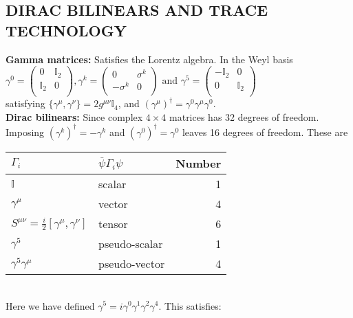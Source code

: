 \documentclass[a4paper, norsk, 8pt, landscape]{article}
\begin{document}
\begin{multicols*}{3}
\subsection*{\footnotesize DIRAC BILINEARS AND TRACE TECHNOLOGY}
 {\textbf{Gamma matrices:}}
Satisfies the Lorentz algebra. In the Weyl basis \\
$
\gamma^0 =
\left(\begin{matrix}
0 & \mathbb{I}_2 \\
\mathbb{I}_2 & 0 \\
\end{matrix}\right),
\gamma^k =
\left(\begin{matrix}
0 & \sigma^k \\
-\sigma^k & 0 \\
\end{matrix}\right) \text{ and }
\gamma^5 =
\left(\begin{matrix}
-\mathbb{I}_2 & 0\\
0 & \mathbb{I}_2 \\
\end{matrix}\right)
$ \\
satisfying $\{\gamma^\mu, \gamma^\nu \} = 2g^{\mu \nu} \mathbb{I}_4$, and
$(\gamma^\mu)^\dagger = \gamma^0 \gamma^\mu \gamma^0$.
\\
 {\textbf{Dirac bilinears:}} Since complex $4\times 4$ matrices has 32
degrees of freedom. Imposing $(\gamma^k)^\dagger = - \gamma^k$ and
$(\gamma^0)^\dagger=\gamma^0$ leaves 16 degrees of freedom. These are \\
\begin{tabular}{l l r}
  $\Gamma_i$                                        & $\overline{\psi}\Gamma_i \psi$  & Number\\    \hline
  $\mathbb{I}$                                      & scalar                          & 1    \\
  $\gamma^\mu$                                      & vector                          & 4    \\
  $S^{\mu\nu}=\frac{i}{2}[\gamma^\mu,\gamma^\nu]$   & tensor                          & 6    \\
  $\gamma^5$                                        & pseudo-scalar                   & 1    \\
  $\gamma^5\gamma^\mu$                              & pseudo-vector                   & 4    \\
\end{tabular} \\
Here we have defined $\gamma^5 = i \gamma^0 \gamma^1 \gamma^2 \gamma^4$. This satisfies: \\

\end{multicols*}
\end{document}
